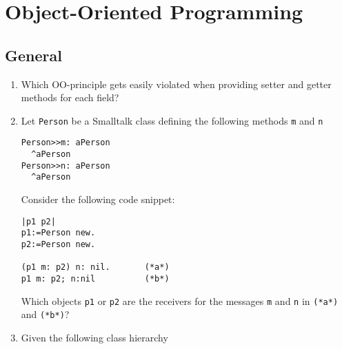 \documentclass{article}
\newcommand{\comment}[1]{\marginpar{#1}}
\begin{document}
\newpage
\section{Object-Oriented Programming} \marginpar{\large\textbf{[15 points]}}

\subsection{General}

\begin{enumerate}
\item \comment{\textbf{[1 point]}} Which OO-principle gets easily
  violated when providing setter and getter methods for each field? 
\item \comment{\textbf{[2 points]}} Let \texttt{Person} be a
  Smalltalk class defining the following methods \texttt{m} and
  \texttt{n}
\begin{lstlisting}
Person>>m: aPerson	
  ^aPerson
Person>>n: aPerson	
  ^aPerson
\end{lstlisting}
Consider the following code snippet:
\begin{lstlisting}
|p1 p2| 
p1:=Person new.
p2:=Person new.

(p1 m: p2) n: nil.       (*a*) 
p1 m: p2; n:nil          (*b*)
\end{lstlisting}
Which objects \lstinline!p1! or \lstinline!p2! are the receivers for the
messages \lstinline!m! and \lstinline!n! in \lstinline!(*a*)! and
\lstinline!(*b*)!? \newpage



\item \comment{\textbf{[3 points]}} Given the following class
  hierarchy \\
\begin{center}
\end{center}
\end{enumerate}
\end{document}
